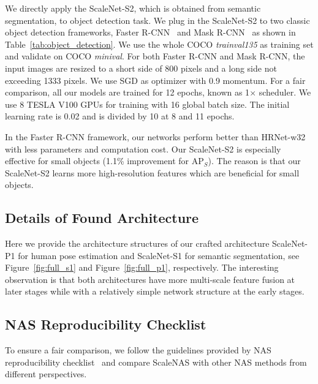 \documentclass[final]{cvpr}
\newcommand{\workname}{ScaleNAS\xspace}
\newcommand{\netname}{ScaleNet\xspace}
\begin{document}
We directly apply the \netname-S2, which is obtained from semantic segmentation, to object detection task. 
We plug in the \netname-S2 to two classic object detection frameworks, Faster R-CNN~\cite{ren2015faster} and Mask R-CNN~\cite{he2017mask} as shown in Table~\ref{tab:object_detection}. We use the whole COCO \textit{trainval135} as training set and validate on COCO \textit{minival}. For both Faster R-CNN and Mask R-CNN, the input images are resized to a short side of 800 pixels and a long side not exceeding 1333 pixels. We use SGD as optimizer with 0.9 momentum. For a fair comparison, all our models are trained for 12 epochs, known as 1$\times$ scheduler. We use 8 TESLA V100 GPUs for training with 16 global batch size. The initial learning rate is 0.02 and is divided by 10 at 8 and 11 epochs. 

In the Faster R-CNN framework, our networks perform better than HRNet-w32 with less parameters and computation cost. Our \netname-S2 is especially effective for small objects (1.1\% improvement for AP$_{S}$). The reason is that our \netname-S2 learns more high-resolution features which are beneficial for small objects. 

\subsection{Details of Found Architecture}
Here we provide the architecture structures of our crafted architecture \netname-P1 for human pose estimation and \netname-S1 for semantic segmentation, see Figure~\ref{fig:full_s1} and Figure~\ref{fig:full_p1}, respectively. 
The interesting observation is that both architectures have more multi-scale feature fusion at later stages while with a relatively simple network structure at the early stages. 


\subsection{NAS Reproducibility Checklist}
To ensure a fair comparison, we follow the guidelines provided by NAS reproducibility checklist~\cite{lindauer2019best} and compare \workname with other NAS methods from different perspectives.
\end{document}
